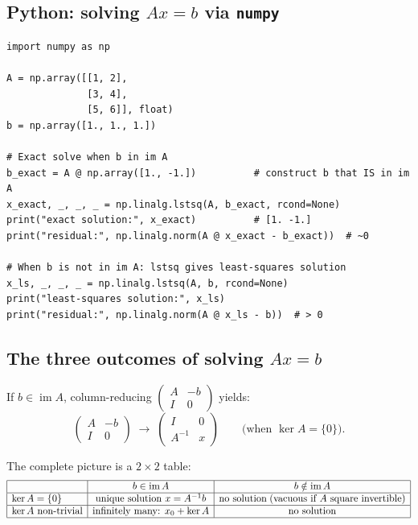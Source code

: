 \documentclass[11pt]{article}
\theoremstyle{definition}
\theoremstyle{plain}
\begin{document}
\subsection{Python: solving $Ax = b$ via \texttt{numpy}}
\begin{lstlisting}
import numpy as np

A = np.array([[1, 2],
              [3, 4],
              [5, 6]], float)
b = np.array([1., 1., 1.])

# Exact solve when b in im A
b_exact = A @ np.array([1., -1.])          # construct b that IS in im A
x_exact, _, _, _ = np.linalg.lstsq(A, b_exact, rcond=None)
print("exact solution:", x_exact)          # [1. -1.]
print("residual:", np.linalg.norm(A @ x_exact - b_exact))  # ~0

# When b is not in im A: lstsq gives least-squares solution
x_ls, _, _, _ = np.linalg.lstsq(A, b, rcond=None)
print("least-squares solution:", x_ls)
print("residual:", np.linalg.norm(A @ x_ls - b))  # > 0
\end{lstlisting}

\subsection{The three outcomes of solving $Ax = b$}

If $b \in \operatorname{im}A$, column-reducing
$\left(\begin{smallmatrix}A & -b \\ I & 0\end{smallmatrix}\right)$
yields:
\[
  \begin{pmatrix}A & -b \\ I & 0\end{pmatrix}
  \;\longrightarrow\;
  \begin{pmatrix}I & 0 \\ A^{-1} & x\end{pmatrix}
  \qquad\text{(when }\ker A = \{0\}\text{)}.
\]

The complete picture is a $2\times 2$ table:
\[
  \begin{array}{|l|c|c|}
    \hline
    & b \in \operatorname{im}A & b \notin \operatorname{im}A \\
    \hline
    \ker A = \{0\} & \text{unique solution } x = A^{-1}b
                   & \text{no solution}
                     \;(\text{vacuous if }A\text{ square invertible}) \\
    \hline
    \ker A \text{ non-trivial} & \text{infinitely many: } x_0 + \ker A
                               & \text{no solution} \\
    \hline
  \end{array}
\]
\end{document}
